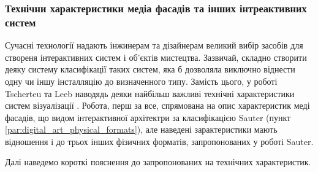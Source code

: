 \documentclass[a4paper,ukrainian,utf8,nocolumnsxix,floatsection,equationsection]{eskdtext}
\renewcommand\paragraph{\subsubsection}
\newcommand{\todoi}[1]{\todo[inline]{#1}}
\begin{document}
\paragraph{Технічни характеристики медіа фасадів та інших інтреактивних систем}

Сучасні технології надають інжинерам та дізайнерам великий вибір засобів для створеня інтерактивних систем і об’єктів мистецтва. Зазвичай, складно створити деяку систему класифікації таких систем, яка б дозволяла виключно віднести одну чи іншу інсталляцію до визначенного типу. Замість цього, у роботі  Tscherteu та Leeb наводядь деяки найбільш важливі технічні характеристики систем візуалізації . Робота, перш за все, спрямована на опис характеристик меді фасадів, що видом інтерактивної архітектри за класифікацією Sauter (пункт \ref{par:digital_art_physical_formats}), але наведені зарактеристики мають відношення і до трьох інших фізичних форматів, запропонованих у роботі Sauter.

\todoi{схема}

Далі наведемо короткі пояснення до запропонованих на  технічних характеристик.
\end{document}

